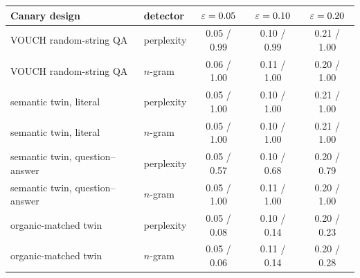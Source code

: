 \begin{tabular}{llccc}
\toprule
Canary design & detector & $\varepsilon=0.05$ & $\varepsilon=0.10$ & $\varepsilon=0.20$ \\
\midrule
VOUCH random-string QA & perplexity & 0.05 / 0.99 & 0.10 / 0.99 & 0.21 / 1.00 \\
VOUCH random-string QA & $n$-gram & 0.06 / 1.00 & 0.11 / 1.00 & 0.20 / 1.00 \\
semantic twin, literal & perplexity & 0.05 / 1.00 & 0.10 / 1.00 & 0.21 / 1.00 \\
semantic twin, literal & $n$-gram & 0.05 / 1.00 & 0.10 / 1.00 & 0.21 / 1.00 \\
semantic twin, question--answer & perplexity & 0.05 / 0.57 & 0.10 / 0.68 & 0.20 / 0.79 \\
semantic twin, question--answer & $n$-gram & 0.05 / 1.00 & 0.11 / 1.00 & 0.20 / 1.00 \\
organic-matched twin & perplexity & 0.05 / 0.08 & 0.10 / 0.14 & 0.20 / 0.23 \\
organic-matched twin & $n$-gram & 0.05 / 0.06 & 0.11 / 0.14 & 0.20 / 0.28 \\
\bottomrule
\end{tabular}
